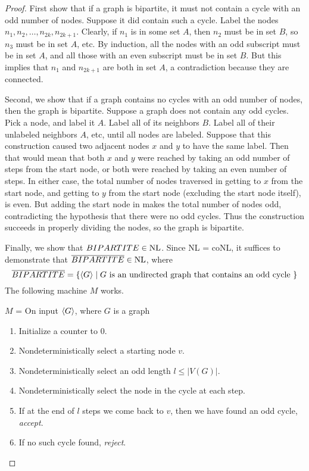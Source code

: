 \begin{mdframed}
\begin{proof}
First show that if a graph is bipartite, it must not contain a cycle with an odd number of nodes. Suppose it did contain such a cycle. Label the nodes $n_1, n_2, \ldots, n_{2k}, n_{2k + 1}$. Clearly, if $n_1$ is in some set $A$, then $n_2$ must be in set $B$, so $n_3$ must be in set $A$, etc. By induction, all the nodes with an odd subscript must be in set $A$, and all those with an even subscript must be in set $B$. But this implies that $n_1$ and $n_{2k+1}$ are both in set $A$, a contradiction because they are connected.

\medskip
Second, we show that if a graph contains no cycles with an odd number of nodes, then the graph is bipartite. Suppose a graph does not contain any odd cycles. Pick a node, and label it $A$. Label all of its neighbors $B$. Label all of their unlabeled neighbors $A$, etc, until all nodes are labeled. Suppose that this construction caused two adjacent nodes $x$ and $y$ to have the same label. Then that would mean that both $x$ and $y$ were reached by taking an odd number of steps from the start node, or both were reached by taking an even number of steps. In either case, the total number of nodes traversed in getting to $x$ from the start node, and getting to $y$ from the start node (excluding the start node itself), is even. But adding the start node in makes the total number of nodes odd, contradicting the hypothesis that there were no odd cycles. Thus the construction succeeds in properly dividing the nodes, so the graph is bipartite.

\medskip
Finally, we show that $BIPARTITE \in \text{NL}$. Since NL = coNL, it suffices to demonstrate that $\overline {BIPARTITE} \in \text{NL}$, where 
\[
\overline {BIPARTITE} = \{ \langle{G}\rangle \mid G \text{ is an undirected graph that contains an odd cycle }\}
\]
The following machine $M$ works.

\medskip
$M$ = On input $\langle{G}\rangle$, where $G$ is a graph
\begin{enumerate}
\item Initialize a counter to 0.
\item Nondeterministically select a starting node $v$.
\item Nondeterministically select an odd length $l \leq |V(G)|$.
\item Nondeterministically select the node in the cycle at each step.
\item If at the end of $l$ steps we come back to $v$, then we have found an odd cycle, \textit{accept}.
\item If no such cycle found, \textit{reject}.
\end{enumerate}
\end{proof}
\end{mdframed}


